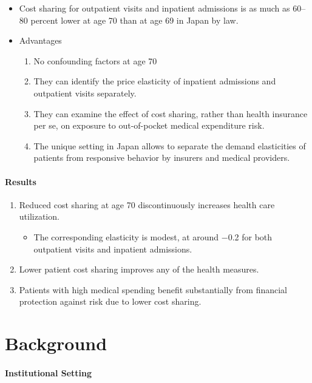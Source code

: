 \documentclass[../root]{subfiles}
\begin{document}
    \begin{itemize}
      \item Cost sharing for outpatient visits and inpatient admissions is as much as 60–80 percent lower at age 70 than at age 69 in Japan by law.
      \item Advantages
      \begin{enumerate}
        \item No confounding factors at age 70
        \item They can identify the price elasticity of inpatient admissions and outpatient visits separately.
        \item They can examine the effect of cost sharing, rather than health insurance per se, on exposure to out-of-pocket medical expenditure risk.
        \item The unique setting in Japan allows to separate the demand elasticities of patients from responsive behavior by insurers and medical providers.
      \end{enumerate}
    \end{itemize}

    \paragraph{Results}

    \begin{enumerate}
      \item Reduced cost sharing at age 70 discontinuously increases health care utilization.
      \begin{itemize}
        \item The corresponding elasticity is modest, at around −0.2 for both outpatient visits and inpatient admissions.
      \end{itemize}
      \item Lower patient cost sharing improves any of the health measures.
      \item Patients with high medical spending benefit substantially from financial protection against risk due to lower cost sharing.
    \end{enumerate}

    \section{Background}

    \paragraph{Institutional Setting}
\end{document}
